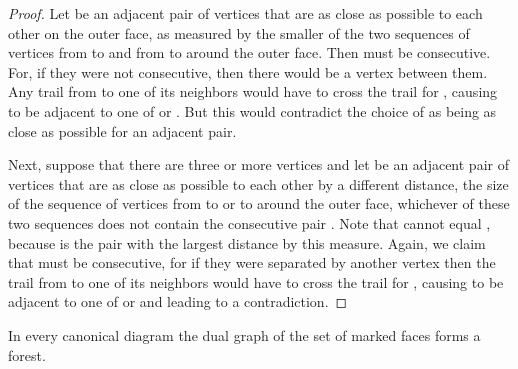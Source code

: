 \documentclass{llncs}
\begin{document}
\begin{proof}
Let  be an adjacent pair of vertices that are as close as possible to each other on the outer face, as measured by the smaller of the two sequences of vertices from  to  and from  to  around the outer face.
Then  must be consecutive. For, if they were not consecutive, then there would be a vertex  between them.  Any trail from  to one of its neighbors would have to cross the trail for , causing  to be adjacent to one of  or . But this would contradict the choice of  as being as close as possible for an adjacent pair.

Next, suppose that there are three or more vertices and let  be an adjacent pair of vertices that are as close as possible to each other by a different distance, the size of the sequence of vertices from  to  or  to  around the outer face, whichever of these two sequences does not contain the consecutive pair . Note that  cannot equal , because  is the pair with the largest distance by this measure. Again, we claim that  must be consecutive, for if they were separated by another vertex  then the trail from  to one of its neighbors would have to cross the trail for , causing  to be adjacent to one of  or  and leading to a contradiction.
\end{proof}

\begin{lemma}
\label{lem:marked-tree}
In every canonical diagram the dual graph of the set of marked faces forms a forest.
\end{lemma}
\end{document}
